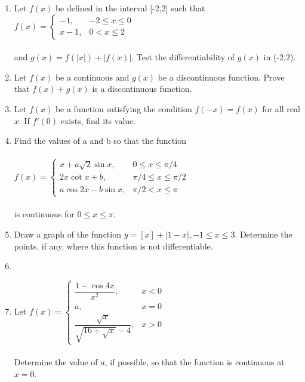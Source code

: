 \documentclass[journal,12pt,twocolumn]{IEEEtran}
\begin{document}
\begin{enumerate}
\item Let $f(x)$ be defined in the interval [-2,2] such that $f(x)=\begin{cases}
-1, &\text{$-2\leq x\leq 0$}\\
x-1, &\text{$0<x\leq 2$}
\end{cases}$ \\ \\and $g(x)=f(|x|)+|f(x)|$. Test the differentiability of $g(x)$ in (-2,2).\\

\item Let $f(x)$ be a continuous and $g(x)$ be a discontinuous function. Prove that $f(x)+g(x)$ is a discontinuous function.\\

\item Let $f(x)$ be a function satisfying the condition $f(-x)=f(x)$ for all real $x$. If $f'(0)$ exists, find its value.\\

\item Find the values of a and b so that the function\\ \\
$f(x)=\begin{cases}
x+a\sqrt{2}\sin x, &\text{$0\leq x\leq \pi/4$}\\
2x\cot x+b, &\text{$\pi/4\leq x\leq \pi/2$}\\
a\cos 2x-b \sin x, &\text{$\pi/2<x\leq \pi$}
\end{cases}$\\ \\is continuous for $0\leq x\leq \pi$.\\

\item Draw a graph of the function $y=[x]+|1-x|, -1\leq x\leq 3$. Determine the points, if any, where this function is not differentiable.
\item[~] 

\item Let $f(x)=\begin{cases}
\dfrac{1-\cos 4x}{x^2}, &\text{$x<0$}\\
a, &\text{$x=0$}\\
\dfrac{\sqrt{x}}{\sqrt{16+\sqrt{x}}-4}, &\text{$x>0$}
\end{cases}$\\ \\ Determine the value of $a$, if possible, so that the function is continuous at $x=0$.\\


\end{enumerate}
\end{document}
